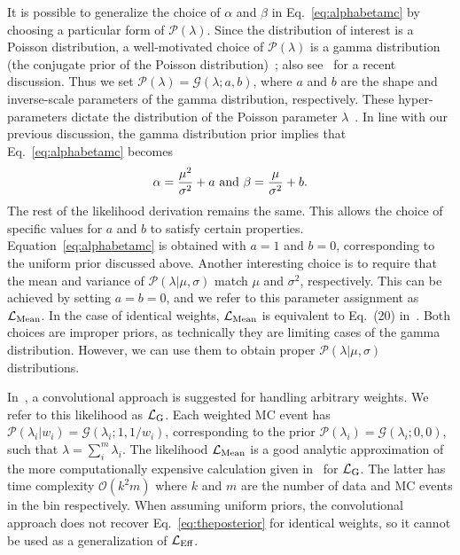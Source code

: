 \documentclass[a4paper, 11pt]{article}
\newcommand{\like}{\mathcal{L}}
\newcommand{\prob}{\mathcal{P}}
\newcommand{\gprob}{\mathcal{G}}
\newcommand{\meanl}{\mathcal{L}_{\textmd{Mean}}}
\newcommand{\mcl}{\like_\textmd{Eff}}
\newcommand{\gl}{\like_\textmd{G}}
\newcommand{\agpar}{\alpha}
\newcommand{\bgpar}{\beta}
\begin{document}
It is possible to generalize the choice of $\alpha$ and $\beta$ in Eq.~\eqref{eq:alphabetamc} by choosing a particular form of $\prob(\lambda)$. Since the distribution of interest is a Poisson distribution, a well-motivated choice of $\prob(\lambda)$ is a gamma distribution (the conjugate prior of the Poisson distribution)~\cite{Fink97acompendium}; also see~\cite{Glusenkamp:2017rlp} for a recent discussion. Thus we set $\prob(\lambda) = \gprob(\lambda; a, b)$, where $a$ and $b$ are the shape and inverse-scale parameters of the gamma distribution, respectively. These hyper-parameters dictate the distribution of the Poisson parameter $\lambda$~\cite{bernardo2009bayesian}. In line with our previous discussion, the gamma distribution prior implies that Eq.~\eqref{eq:alphabetamc} becomes
\begin{equation}\label{eq:alphabetagamma}
\agpar = \frac{\mu^2}{\sigma^2}+a~\textmd{and}~\bgpar=\frac{\mu}{\sigma^2}+b.
\end{equation}
The rest of the likelihood derivation remains the same. This allows the choice of specific values for $a$ and $b$ to satisfy certain properties. Equation~\eqref{eq:alphabetamc} is obtained with $a=1$ and $b=0$, corresponding to the uniform prior discussed above. Another interesting choice is to require that the mean and variance of $\prob(\lambda|\mu, \sigma)$ match $\mu$ and $\sigma^2$, respectively. This can be achieved by setting $a=b=0$, and we refer to this parameter assignment as $\meanl$. In the case of identical weights, $\meanl$ is equivalent to Eq.~(20) in~\cite{Glusenkamp:2017rlp}. Both choices are improper priors, as technically they are limiting cases of the gamma distribution. However, we can use them to obtain proper $\prob(\lambda|\mu, \sigma)$ distributions.

In~\cite{Glusenkamp:2017rlp}, a convolutional approach is suggested for handling arbitrary weights. We refer to this likelihood as $\gl$. Each weighted MC event has $\prob(\lambda_i|w_i)=\gprob(\lambda_i; 1, 1/w_i)$, corresponding to the prior $\prob(\lambda_i) = \gprob(\lambda_i;0,0)$, such that $\lambda = \sum_i^m \lambda_i$. The likelihood $\meanl$ is a good analytic approximation of the more computationally expensive calculation given in~\cite{Glusenkamp:2017rlp} for $\gl$. The latter has time complexity $\mathcal{O}(k^2 m)$ where $k$ and $m$ are the number of data and MC events in the bin respectively. When assuming uniform priors, the convolutional approach does not recover Eq.~\eqref{eq:theposterior} for identical weights, so it cannot be used as a generalization of $\mcl$.
\end{document}
